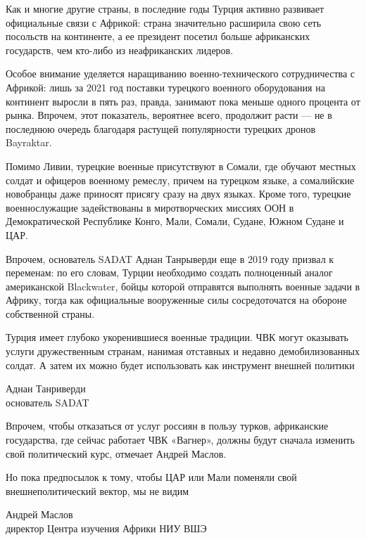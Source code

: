 Как и многие другие страны, в последние годы Турция активно развивает официальные связи с Африкой: страна значительно расширила свою сеть посольств на континенте, а ее президент посетил больше африканских государств, чем кто-либо из неафриканских лидеров.

Особое внимание уделяется наращиванию военно-технического сотрудничества с Африкой: лишь за 2021 год поставки турецкого военного оборудования на континент выросли в пять раз, правда, занимают пока меньше одного процента от рынка. Впрочем, этот показатель, вероятнее всего, продолжит расти — не в последнюю очередь благодаря растущей популярности турецких дронов Bayraktar.

Помимо Ливии, турецкие военные присутствуют в Сомали, где обучают местных солдат и офицеров военному ремеслу, причем на турецком языке, а сомалийские новобранцы даже приносят присягу сразу на двух языках. Кроме того, турецкие военнослужащие задействованы в миротворческих миссиях ООН в Демократической Республике Конго, Мали, Сомали, Судане, Южном Судане и ЦАР.

Впрочем, основатель SADAT Аднан Танрыверди еще в 2019 году призвал к переменам: по его словам, Турции необходимо создать полноценный аналог американской Blackwater, бойцы которой отправятся выполнять военные задачи в Африку, тогда как официальные вооруженные силы сосредоточатся на обороне собственной страны.

\begin{fancyquotes}
    Турция имеет глубоко укоренившиеся военные традиции. ЧВК могут оказывать услуги дружественным странам, нанимая отставных и недавно демобилизованных солдат. А затем их можно будет использовать как инструмент внешней политики

    \begin{flushright}
        Аднан Танриверди\\
        основатель SADAT
    \end{flushright}
\end{fancyquotes}

Впрочем, чтобы отказаться от услуг россиян в пользу турков, африканские государства, где сейчас работает ЧВК «Вагнер», должны будут сначала изменить свой политический курс, отмечает Андрей Маслов.

\begin{fancyquotes}
    Но пока предпосылок к тому, чтобы ЦАР или Мали поменяли свой внешнеполитический вектор, мы не видим

    \begin{flushright}
        Андрей Маслов\\
        директор Центра изучения Африки НИУ ВШЭ
    \end{flushright}
\end{fancyquotes}


